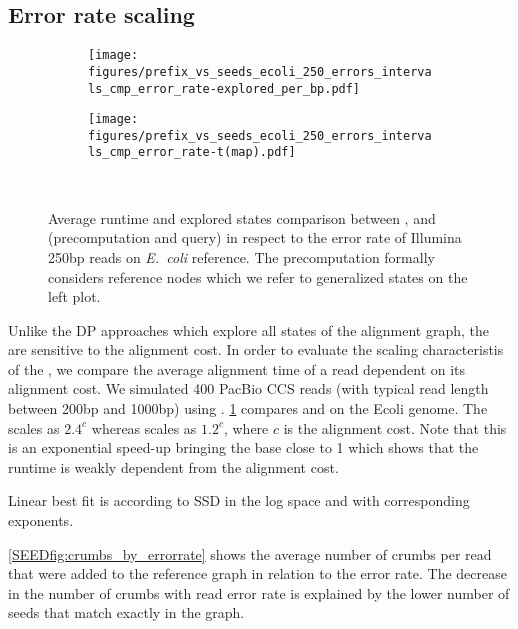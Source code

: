 \subsection{Error rate scaling}
\begin{figure}[t]
  \begin{subfigure}{.49\textwidth}
    \centering
    \texttt{[image: figures/prefix\_vs\_seeds\_ecoli\_250\_errors\_intervals\_cmp\_error\_rate-explored\_per\_bp.pdf]}
  \end{subfigure}%
  \begin{subfigure}{.45\textwidth}
    \centering
    \texttt{[image: figures/prefix\_vs\_seeds\_ecoli\_250\_errors\_intervals\_cmp\_error\_rate-t(map).pdf]}
  \end{subfigure}~\hspace{1em} \caption{Average runtime and explored states
  comparison between \dijkstra, \prefixh and \seedh (precomputation and query)
  in respect to the error rate of Illumina 250bp reads on \textit{E.~coli}
  reference. The \seedh precomputation formally considers reference nodes which
  we refer to generalized states on the left plot. }
  \label{SEEDfig:scaling_with_errorrate}
\end{figure}

Unlike the DP approaches which explore all states of the alignment graph, the \A
are sensitive to the alignment cost. In order to evaluate the scaling
characteristis of the \seedh, we compare the average alignment time of a read
dependent on its alignment cost. We simulated 400 PacBio CCS reads (with typical
read length between 200bp and 1000bp) using \randomreads.
\cref{SEEDfig:scaling_with_errorrate} compares \seedh and \prefixh on the Ecoli
genome. The \prefixh scales as $2.4^c$ whereas \seedh scales as $1.2^c$, where
$c$ is the alignment cost. Note that this is an exponential speed-up bringing
the base close to 1 which shows that the runtime is weakly dependent from the
alignment cost.

Linear best fit is according to SSD in the log space and with corresponding exponents.

\cref{SEEDfig:crumbs_by_errorrate} shows the average number of crumbs per read that
were added to the reference graph in relation to the error rate. The decrease in
the number of crumbs with read error rate is explained by the lower number of
seeds that match exactly in the graph.